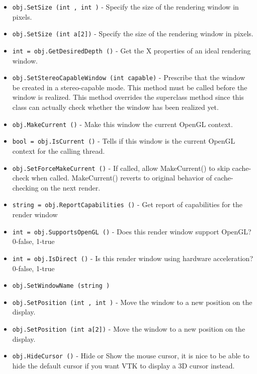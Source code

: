 \begin{itemize}
\item  \verb|obj.SetSize (int , int )| -  Specify the size of the rendering window in pixels.

\item  \verb|obj.SetSize (int a[2])| -  Specify the size of the rendering window in pixels.

\item  \verb|int = obj.GetDesiredDepth ()| -  Get the X properties of an ideal rendering window.

\item  \verb|obj.SetStereoCapableWindow (int capable)| -  Prescribe that the window be created in a stereo-capable mode. This
 method must be called before the window is realized. This method
 overrides the superclass method since this class can actually check
 whether the window has been realized yet.

\item  \verb|obj.MakeCurrent ()| -  Make this window the current OpenGL context.

\item  \verb|bool = obj.IsCurrent ()| -  Tells if this window is the current OpenGL context for the calling thread.

\item  \verb|obj.SetForceMakeCurrent ()| -  If called, allow MakeCurrent() to skip cache-check when called.
 MakeCurrent() reverts to original behavior of cache-checking     
 on the next render.     

\item  \verb|string = obj.ReportCapabilities ()| -  Get report of capabilities for the render window

\item  \verb|int = obj.SupportsOpenGL ()| -  Does this render window support OpenGL? 0-false, 1-true

\item  \verb|int = obj.IsDirect ()| -  Is this render window using hardware acceleration? 0-false, 1-true

\item  \verb|obj.SetWindowName (string )|

\item  \verb|obj.SetPosition (int , int )| -  Move the window to a new position on the display.

\item  \verb|obj.SetPosition (int a[2])| -  Move the window to a new position on the display.

\item  \verb|obj.HideCursor ()| -  Hide or Show the mouse cursor, it is nice to be able to hide the
 default cursor if you want VTK to display a 3D cursor instead.


\end{itemize}

